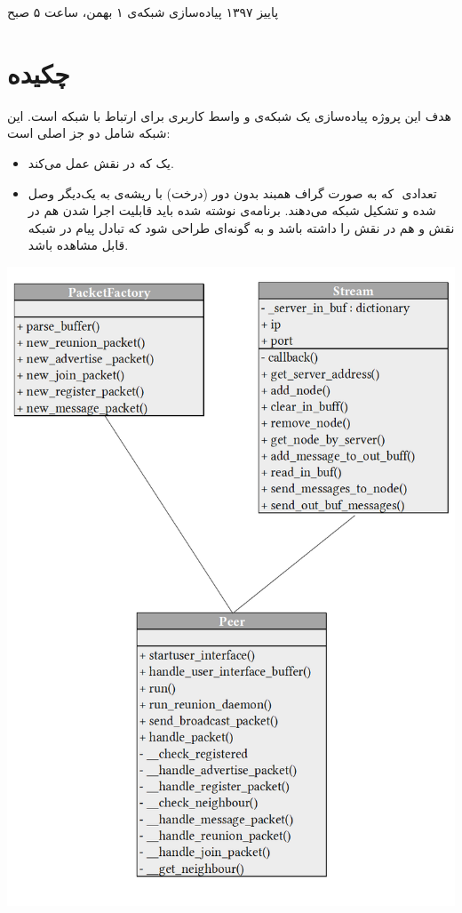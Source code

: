 \documentclass{article}
\begin{document}
    \handout
    {}
    {}
    {پاییز ۱۳۹۷}
    {پیاده‌سازی شبکه‌ی }
    {۱ بهمن، ساعت ۵ صبح}
    
    \vspace{0.3cm}
     
\section{چکیده}

   هدف این پروژه پیاده‌سازی یک شبکه‌ی  و واسط کاربری برای ارتباط با شبکه است.  این شبکه شامل دو جز اصلی است: 

\begin{itemize}
   \item   	یک  که در نقش  عمل می‌کند.

\item تعدادی ‌ که به صورت گراف همبند بدون دور (درخت) با ریشه‌ی  به یک‌دیگر وصل شده و تشکیل شبکه می‌دهند.
   برنامه‌ی نوشته شده باید قابلیت اجرا شدن هم در نقش  و هم در نقش  را داشته باشد و به گونه‌ای طراحی شود که تبادل پیام در شبکه قابل مشاهده باشد.
\end{itemize}
 

	\newpage
\begin{center}
	\vspace*{3cm}
	\includegraphics[scale=0.9]{UML1}
\end{center}
\end{document}
